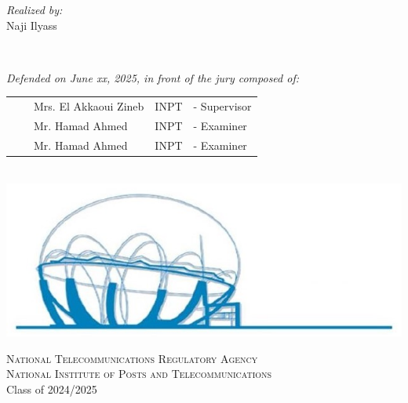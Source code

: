 \begin{titlepage}
\begin{center}
  \noindent
  \begin{minipage}{0.9\textwidth}
    \vspace{-7mm}
    \begin{flushleft} \large
      \emph{Realized by:}\\ \vspace{0.2cm}
      \hspace{0.95cm} Naji Ilyass  \\
    \end{flushleft}
  \end{minipage}
  \begin{minipage}{0.4\textwidth}
  \end{minipage}\\[1.3cm]

  \vspace{0.2cm}

  \begin{minipage}{0.9\textwidth}
    \vspace{-7mm}
    \begin{flushleft} \large
      \emph{Defended on June xx, 2025, in front of the jury composed of:}\\ \vspace{0.3cm}
      \begin{tabular}{ll  l l l}
      &&Mrs. El Akkaoui Zineb & INPT  & - Supervisor \\
      &&Mr. Hamad Ahmed & INPT  & - Examiner \\
      &&Mr. Hamad Ahmed & INPT  & - Examiner \\
      \end{tabular}
    \end{flushleft}
  \end{minipage}\\[0.6cm]


  \includegraphics[scale=0.8]{Images/inpt_fig.jpg}
  
  \vspace{0.2cm}
  \textsc{National Telecommunications Regulatory Agency}\\
  \textsc{National Institute of Posts and Telecommunications}\\
  \vspace{0.5cm}
  {\large Class of 2024/2025}
  
  \end{center}
  \end{titlepage}
  